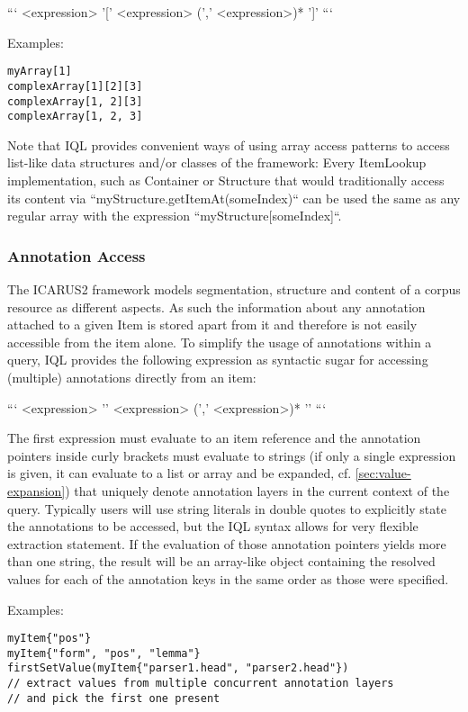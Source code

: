 \documentclass[11pt]{article}
\begin{document}
```
<expression> '[' <expression> (',' <expression>)* ']'
```

Examples:

\begin{verbatim}
myArray[1]
complexArray[1][2][3]
complexArray[1, 2][3]
complexArray[1, 2, 3]
\end{verbatim}

Note that IQL provides convenient ways of using array access patterns to access list-like data structures and/or classes of the framework:
Every ItemLookup implementation, such as Container or Structure that would traditionally access its content via ``myStructure.getItemAt(someIndex)`` can be used the same as any regular array with the expression ``myStructure[someIndex]``.

\subsubsection{Annotation Access}
\label{sec:annotation-access}

The ICARUS2 framework models segmentation, structure and content of a corpus resource as different aspects. As such the information about any annotation attached to a given Item is stored apart from it and therefore is not easily accessible from the item alone. To simplify the usage of annotations within a query, IQL provides the following expression as syntactic sugar for accessing (multiple) annotations directly from an item:

```
<expression> '{' <expression> (',' <expression>)* '}'
```

The first expression must evaluate to an item reference and the annotation pointers inside curly brackets must evaluate to strings (if only a single expression is given, it can evaluate to a list or array and be expanded, cf. \cref{sec:value-expansion}) that uniquely denote annotation layers in the current context of the query. Typically users will use string literals in double quotes to explicitly state the annotations to be accessed, but the IQL syntax allows for very flexible extraction statement. If the evaluation of those annotation pointers yields more than one string, the result will be an array-like object containing the resolved values for each of the annotation keys in the same order as those were specified.

Examples:

\begin{verbatim}
myItem{"pos"}
myItem{"form", "pos", "lemma"}
firstSetValue(myItem{"parser1.head", "parser2.head"})   
// extract values from multiple concurrent annotation layers
// and pick the first one present
\end{verbatim}
\end{document}
